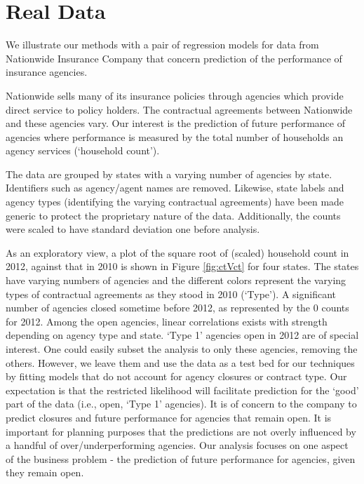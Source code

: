 \documentclass[ba]{imsart}
\begin{document}
%
%
\section{Real Data}
\label{RealData}
We illustrate our methods with a pair of regression models for data from Nationwide Insurance Company that concern prediction of the performance of insurance agencies.

%
Nationwide sells many of its insurance policies through agencies which provide direct service to policy holders.  The contractual agreements between Nationwide and these agencies vary.  Our interest is the prediction of future performance of agencies where  performance is measured by the total number of households an agency services (`household count'). 
 
The data are grouped by states with a varying number of agencies by state. Identifiers such as agency/agent names are removed. Likewise, state labels and agency types (identifying the varying contractual agreements) have been made generic to protect the proprietary nature of the data. Additionally, the counts were scaled to have standard deviation one before analysis. 

As an exploratory view, a plot of the square root of (scaled) household count in 2012, against that in 2010 
is shown in Figure \ref{fig:ctVct} for four states. The states have varying numbers of agencies and  the different colors represent the varying types of contractual agreements as they stood in 2010 (`Type').  A significant number of agencies closed sometime before 2012, as represented by the $0$ counts for 2012. Among the open agencies, linear correlations exists with strength depending on agency type and state.  `Type 1' agencies open in 2012 are of special interest.  One could easily subset the analysis to only these agencies, removing the others. However,  we leave them and use the data as a test bed for our techniques by fitting models that do not account for agency closures or contract type.  Our expectation is that the restricted likelihood will facilitate prediction for the `good' part of the data (i.e., open, `Type 1' agencies).  It is of concern to the company to predict closures and future performance for agencies that remain open. It is important for planning purposes that the predictions are not overly influenced by a handful of over/underperforming agencies. Our analysis focuses on one aspect of the business problem - the prediction of future performance for agencies, given they remain open.  
\end{document}
